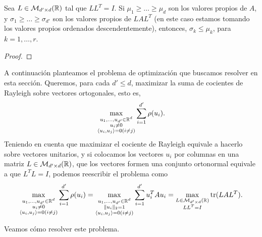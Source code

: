 \begin{cor} \label{cor: interlace}
    Sea $L \in \mathcal{M}_{d' \times d}(\mathbb{R})$ tal que $LL^T = I$. Si $\mu_1 \ge \dots \ge \mu_d$ son los valores propios de $A$, y $\sigma_1 \ge \dots \ge \sigma_{d'}$ son los valores propios de $LAL^T$ (en este caso estamos tomando los valores propios ordenados descendentemente), entonces, $\sigma_k \le \mu_k$, para $k = 1,\dots,r$.
\end{cor}

\begin{proof}

\end{proof}

A continuación planteamos el problema de optimización que buscamos resolver en esta sección. Queremos, para cada $d' \le d$, maximizar la suma de cocientes de Rayleigh sobre vectores ortogonales, esto es,
\begin{equation}
    \max_{\substack{u_1,\dots,u_{d'} \in  \mathbb{R}^d \\ u_i \ne 0 \\ \langle u_i, u_j \rangle = 0 (i \ne j)}} \sum_{i=1}^{d'} \rho(u_i).
\end{equation}
Teniendo en cuenta que maximizar el cociente de Rayleigh equivale a hacerlo sobre vectores unitarios, y si colocamos los vectores $u_i$ por columnas en una matriz $L \in \mathcal{M}_{d'\times d}(\mathbb{R})$, que los vectores formen una conjunto ortonormal equivale a que $L^TL = I$, podemos reescribir el problema como
\begin{equation}
    \max_{\substack{u_1,\dots,u_{d'} \in  \mathbb{R}^d \\ u_i \ne 0 \\ \langle u_i, u_j \rangle = 0 (i \ne j)}} \sum_{i=1}^{d'} \rho(u_i) = \max_{\substack{u_1,\dots,u_{d'} \in  \mathbb{R}^d \\ \|u_i\|_2 = 1 \\ \langle u_i, u_j \rangle = 0 (i \ne j)}} \sum_{i=1}^{d'} u_i^TAu_i = \max_{\substack{L \in \mathcal{M}_{d'\times d}(\mathbb{R}) \\ LL^T  = I}} \operatorname{tr}(LAL^T). 
\end{equation}

Veamos cómo resolver este problema.

